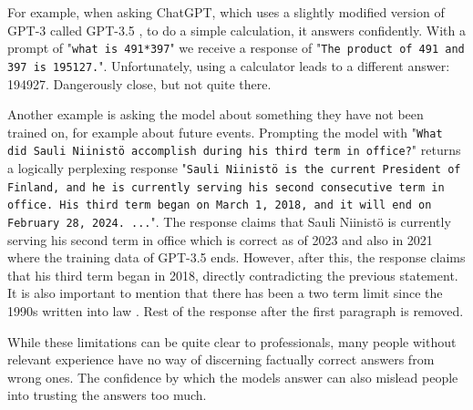 \documentclass[twoside]{article}
\begin{document}
For example, when asking ChatGPT, which uses a slightly modified version of GPT-3 called 
GPT-3.5 \cite{noauthor_introducing_nodate-1}, to do a simple calculation, it answers confidently. 
With a prompt of "\texttt{what is 491*397}" we receive a response of 
"\texttt{The product of 491 and 397 is 195127.}". Unfortunately, using a calculator
leads to a different answer: 194927. Dangerously close, but not quite there.

Another example is asking the model about something they have not been trained on, for
example about future events. Prompting the model with 
"\texttt{What did Sauli Niinistö accomplish during his third term in office?}" returns
a logically perplexing response "\texttt{Sauli Niinistö is the current President of Finland, 
and he is currently serving his second consecutive term in office. 
His third term began on March 1, 2018, and it will end on February 28, 2024. ...}".
The response claims that Sauli Niinistö is currently serving his second term in office
which is correct as of 2023 and also in 2021 where the training data of GPT-3.5 ends. 
However, after this, the response claims that his third term began
in 2018, directly contradicting the previous statement. It is also important to mention
that there has been a two term limit since the 1990s written into law 
\cite{oy_finlex_nodate}. Rest of the response after the first paragraph is removed.

While these limitations can be quite clear to professionals, many people without relevant
experience have no way of discerning factually correct answers from wrong ones. The confidence
by which the models answer can also mislead people into trusting the answers too much.



\printbibliography
\end{document}
